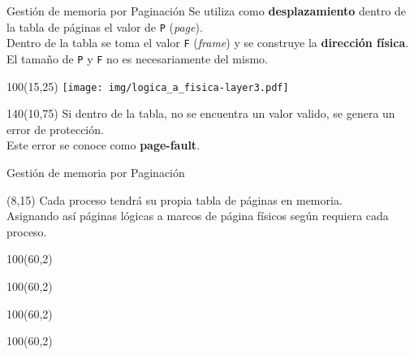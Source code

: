 \documentclass[aspectratio=169]{beamer}
\begin{document}
\begin{frame}[t]{Gestión de memoria por Paginación}
    Se utiliza como \textcolor{verdeuca}{\textbf{desplazamiento}} dentro de la tabla de páginas el valor de \texttt{P} (\emph{page}).\\
    \medskip
    Dentro de la tabla se toma el valor \texttt{F} (\emph{frame}) y se construye la \textcolor{verdeuca}{\textbf{dirección física}}.\\
    \medskip
    El tamaño de \texttt{P} y \texttt{F} no es necesariamente del mismo.\\
    \begin{textblock}{100}(15,25)
    \texttt{[image: img/logica\_a\_fisica-layer3.pdf]}
    \end{textblock}
    \begin{textblock}{140}(10,75)
    Si dentro de la tabla, no se encuentra un valor valido, se genera un error de protección.\\
    Este error se conoce como \textcolor{naranjauca}{\textbf{page-fault}}.
    \end{textblock}
\end{frame}

\begin{frame}[t]{Gestión de memoria por Paginación}
    \begin{textblock}{60}(8,15)
    \small
    Cada proceso tendrá su propia tabla de páginas en memoria.\\
    \medskip
    Asignando así páginas lógicas a marcos de página físicos según requiera cada proceso.\\
    \medskip
    \bigskip
    \medskip
    \end{textblock}    
    \begin{textblock}{100}(60,2)  \end{textblock} %
    \begin{textblock}{100}(60,2)  \end{textblock} %
    \begin{textblock}{100}(60,2)  \end{textblock} %
    \begin{textblock}{100}(60,2)  \end{textblock} %
\end{frame}
\end{document}
